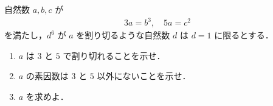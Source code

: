 \documentclass[../../main.tex]{subfiles}
\begin{document}
自然数 $a, b, c$ が
\begin{align}
  3a = b^3, \quad 5a = c^2
\end{align}
を満たし，$d^6$ が $a$ を割り切るような自然数 $d$ は $d=1$ に限るとする．

\begin{enumerate}
  \item $a$ は $3$ と $5$ で割り切れることを示せ．
  \item $a$ の素因数は $3$ と $5$ 以外にないことを示せ．
  \item $a$ を求めよ．
\end{enumerate}
\end{document}
